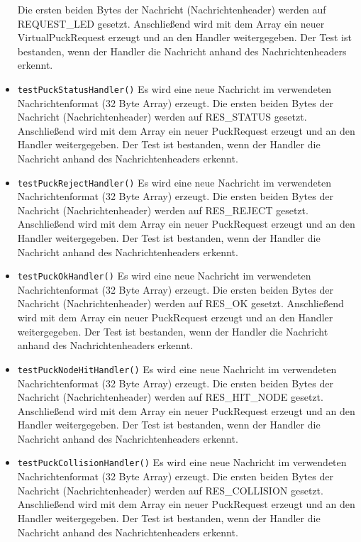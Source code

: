 \documentclass[10pt,a4paper]{article}
\begin{document}
\begin{itemize}
				Die ersten beiden Bytes der Nachricht (Nachrichtenheader) werden auf REQUEST\_LED gesetzt. Anschließend wird mit dem Array ein neuer
				VirtualPuckRequest erzeugt und an den Handler weitergegeben.
				Der Test ist bestanden, wenn der Handler die Nachricht anhand des Nachrichtenheaders erkennt.
				\item \texttt{testPuckStatusHandler()} Es wird eine neue Nachricht im verwendeten Nachrichtenformat (32 Byte Array) erzeugt.
				Die ersten beiden Bytes der Nachricht (Nachrichtenheader) werden auf RES\_STATUS gesetzt. Anschließend wird mit dem Array ein
				neuer PuckRequest erzeugt und an den Handler weitergegeben.
				Der Test ist bestanden, wenn der Handler die Nachricht anhand des Nachrichtenheaders erkennt.
				\item \texttt{testPuckRejectHandler()} Es wird eine neue Nachricht im verwendeten Nachrichtenformat (32 Byte Array) erzeugt.
				Die ersten beiden Bytes der Nachricht (Nachrichtenheader) werden auf RES\_REJECT gesetzt. Anschließend wird mit dem Array ein
				neuer PuckRequest erzeugt und an den Handler weitergegeben.
				Der Test ist bestanden, wenn der Handler die Nachricht anhand des Nachrichtenheaders erkennt.
				\item \texttt{testPuckOkHandler()} Es wird eine neue Nachricht im verwendeten Nachrichtenformat (32 Byte Array) erzeugt.
				Die ersten beiden Bytes der Nachricht (Nachrichtenheader) werden auf RES\_OK gesetzt. Anschließend wird mit dem Array ein
				neuer PuckRequest erzeugt und an den Handler weitergegeben.
				Der Test ist bestanden, wenn der Handler die Nachricht anhand des Nachrichtenheaders erkennt.
				\item \texttt{testPuckNodeHitHandler()} Es wird eine neue Nachricht im verwendeten Nachrichtenformat (32 Byte Array) erzeugt.
				Die ersten beiden Bytes der Nachricht (Nachrichtenheader) werden auf RES\_HIT\_NODE gesetzt. Anschließend wird mit dem Array ein
				neuer PuckRequest erzeugt und an den Handler weitergegeben.
				Der Test ist bestanden, wenn der Handler die Nachricht anhand des Nachrichtenheaders erkennt.
				\item \texttt{testPuckCollisionHandler()} Es wird eine neue Nachricht im verwendeten Nachrichtenformat (32 Byte Array)
				erzeugt. Die ersten beiden Bytes der Nachricht (Nachrichtenheader) werden auf RES\_COLLISION gesetzt. Anschließend wird mit dem Array
				ein neuer PuckRequest erzeugt und an den Handler weitergegeben.
				Der Test ist bestanden, wenn der Handler die Nachricht anhand des Nachrichtenheaders erkennt.

\end{itemize}
\end{document}
